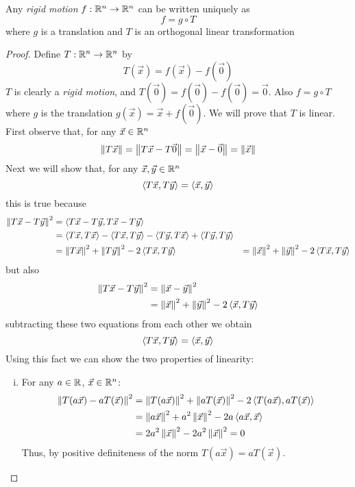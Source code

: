 \begin{theorem}
  Any \emph{rigid motion} $f : \mathbb{R}^n \to \mathbb{R}^n$ can be written uniquely as
    $$f = g \circ T$$
  where $g$ is a translation and $T$ is an orthogonal linear transformation
\end{theorem}
\begin{proof}
  Define $T : \mathbb{R}^n \to \mathbb{R}^n$ by
    $$T(\vec x) = f(\vec x) - f(\vec 0)$$
  $T$ is clearly a \emph{rigid motion}, and $T(\vec 0) = f(\vec 0) - f(\vec 0) = \vec 0$.
  Also $f = g \circ T$ where $g$ is the translation $g(\vec x) = \vec x + f(\vec 0)$.
  We will prove that $T$ is linear.
  First observe that, for any $\vec x \in \mathbb{R}^n$
    $$\left\lVert T \vec x\right\rVert = \left\lVert T \vec x - T \vec 0\right\rVert = \left\lVert\vec x - \vec 0\right\rVert = \left\lVert\vec x\right\rVert$$
  Next we will show that, for any $\vec x, \vec y \in \mathbb{R}^n$
    $$\left\langle T\vec x , T\vec y \right\rangle = \left\langle \vec x , \vec y \right\rangle$$
  this is true because
    \begin{align}
      \left\lVert T\vec x - T\vec y\right\rVert^2 
        &= \left\langle T\vec x - T\vec y , T \vec x - T \vec y \right\rangle \\
        &= \left\langle T \vec x , T \vec x \right\rangle - \left\langle T \vec x , T \vec y \right\rangle - \left\langle T \vec y , T \vec x \right\rangle + \left\langle T\vec y , T \vec y \right\rangle \\
        &= \left\lVert T\vec x\right\rVert^2 + \left\lVert T \vec y\right\rVert^2 - 2\left\langle T \vec x , T \vec y \right\rangle
        &= \left\lVert\vec x\right\rVert^2 + \left\lVert\vec y\right\rVert^2 - 2\left\langle T \vec x , T \vec y \right\rangle
    \end{align}
  but also
    \begin{align}
      \left\lVert T \vec x - T\vec y\right\rVert^2
        &= \left\lVert\vec x - \vec y\right\rVert^2 \\
        &= \left\lVert\vec x\right\rVert^2 + \left\lVert\vec y\right\rVert^2 - 2\left\langle \vec x , T \vec y \right\rangle
    \end{align}
  subtracting these two equations from each other we obtain
    $$\left\langle T \vec x , T \vec y \right\rangle = \left\langle \vec x , \vec y \right\rangle$$
  Using this fact we can show the two properties of linearity:
  \begin{enumerate}[i.]
    \item For any $a \in \mathbb{R}$, $\vec x \in \mathbb{R}^n$:
      \begin{align}
        \left\lVert T(a \vec x) - aT(\vec x)\right\rVert^2
          &= \left\lVert T(a\vec x)\right\rVert^2 + \left\lVert aT(\vec x)\right\rVert^2 - 2\left\langle T(a \vec x) , aT(\vec x) \right\rangle \\
          &= \left\lVert a\vec x\right\rVert^2 + a^2\left\lVert\vec x\right\rVert^2 - 2a\left\langle a \vec x , \vec x \right\rangle \\
          &= 2a^2\left\lVert\vec x\right\rVert^2 - 2a^2\left\lVert\vec x\right\rVert^2 = 0
      \end{align}
      Thus, by positive definiteness of the norm $T(a\vec x) = aT(\vec x)$.


\end{enumerate}
\end{proof}
